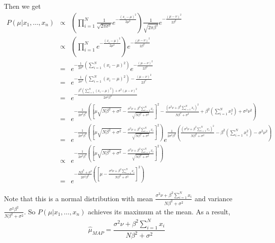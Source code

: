 \documentclass[12pt]{article}
\begin{document}
Then we get
\begin{eqnarray*}
  P(\mu | x_1,\dots,x_n)
  &\varpropto& \left( \prod_{i=1}^N \frac {1}{\sqrt{2 \pi \sigma^2}} 
    e^{-\frac {(x_i-\mu)^2}{2\mu^2}} \right) \frac{1}{\sqrt{2 \pi \beta^2}}
  e^{-\frac{(\mu -\nu)^2}{2\beta^2}} \\
  &\varpropto& \left( \prod_{i=1}^N e^{-\frac {(x_i-\mu)^2}{2\mu^2}} \right)
  e^{-\frac{(\mu -\nu)^2}{2\beta^2}} \\
  &=& e^{-\frac{1}{2\sigma^2} \left( \sum_{i=1}^N (x_i - \mu)^2 \right)}
  e^{-\frac{(\mu-\nu)^2}{2\beta^2}} \\
  &=& e^{-\frac{1}{2\sigma^2} \left( \sum_{i=1}^N (x_i - \mu)^2 \right)
    -\frac{(\mu-\nu)^2}{2\beta^2}} \\
  &=& e^{-\frac{\beta^2 \left( \sum_{i=1}^N (x_i - \mu)^2 \right)
      + \sigma^2 (\mu-\nu)^2}{2\sigma^2 \beta^2}} \\
  &=& e^{-\frac{1}{2\sigma^2 \beta^2} \left( \left[\mu \sqrt{N \beta^2
          + \sigma^2} - \frac{\sigma^2 \nu + \beta^2 \sum_{i=1}^N x_i}
        {\sqrt {N \beta^2 + \sigma^2}} \right]^2 - \frac{(\sigma^2 \nu
        + \beta^2 \sum_{i=1}^N x_i)^2} {N\beta^2 + \sigma^2}
      + \beta^2 \left( \sum_{i=1}^N x_i^2 \right) + \sigma^2 \nu^2 \right) } \\
  &=& e^{-\frac{1}{2\sigma^2 \beta^2} \left( \left[\mu \sqrt{N \beta^2
          + \sigma^2} - \frac{\sigma^2 \nu + \beta^2 \sum_{i=1}^N x_i}
        {\sqrt {N \beta^2 + \sigma^2}} \right]^2 \right)}
      e^{\frac{1}{2\sigma^2 \beta^2} \left( \frac{(\sigma^2 \nu + \beta^2 
          \sum_{i=1}^N x_i)^2}{N\beta^2 + \sigma^2} - \beta^2 \left(
          \sum_{i=1}^N x_i^2 \right) - \sigma^2 \nu^2 \right)} \\
  &\varpropto& e^{-\frac{1}{2\sigma^2 \beta^2} \left( \left[\mu
       \sqrt{N \beta^2 + \sigma^2} - \frac{\sigma^2 \nu + \beta^2 \sum_{i=1}^N
         x_i} {\sqrt {N \beta^2 + \sigma^2}} \right]^2 \right)} \\
  &=& e^{-\frac{N \beta^2 + \sigma^2}{2\sigma^2 \beta^2} \left( \left[\mu
        - \frac{\sigma^2 \nu + \beta^2 \sum_{i=1}^N
         x_i} {N \beta^2 + \sigma^2} \right]^2 \right)}
\end{eqnarray*}

Note that this is a normal distribution with mean $\frac{\sigma^2 \nu + \beta^2 \sum_{i=1}^N x_i} {N \beta^2 + \sigma^2}$ and variance $\frac {\sigma^2 \beta^2}{N \beta^2 + \sigma^2}$. So $P(\mu | x_1,\dots,x_n)$ achieves its maximum at the mean. As a result,
\begin{equation*}
  \hat{\mu}_{MAP} = \frac{\sigma^2 \nu + \beta^2 \sum_{i=1}^N x_i}
  {N \beta^2 + \sigma^2}
\end{equation*}
\end{document}
